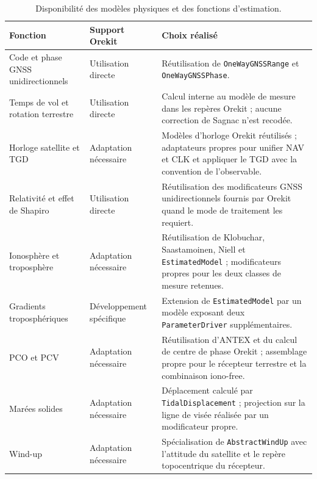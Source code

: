\begin{table}[H]
\centering
\caption{Disponibilité des modèles physiques et des fonctions d'estimation.}
\label{tab:orekit_model_support}
\small
\begin{tabularx}{\textwidth}{p{3.3cm} p{3.0cm} X}
\hline
\textbf{Fonction} & \textbf{Support Orekit} & \textbf{Choix réalisé} \\
\hline
Code et phase GNSS unidirectionnels & Utilisation directe &
Réutilisation de \texttt{OneWayGNSSRange} et
\texttt{OneWayGNSSPhase}. \\

Temps de vol et rotation terrestre & Utilisation directe &
Calcul interne au modèle de mesure dans les repères Orekit ; aucune correction
de Sagnac n'est recodée. \\

Horloge satellite et TGD & Adaptation nécessaire &
Modèles d'horloge Orekit réutilisés ; adaptateurs propres pour unifier NAV et
CLK et appliquer le TGD avec la convention de l'observable. \\

Relativité et effet de Shapiro & Utilisation directe &
Réutilisation des modificateurs GNSS unidirectionnels fournis par Orekit quand
le mode de traitement les requiert. \\

Ionosphère et troposphère & Adaptation nécessaire &
Réutilisation de Klobuchar, Saastamoinen, Niell et
\texttt{EstimatedModel} ; modificateurs propres pour les deux classes de
mesure retenues. \\

Gradients troposphériques & Développement spécifique &
Extension de \texttt{EstimatedModel} par un modèle exposant deux
\texttt{ParameterDriver} supplémentaires. \\

PCO et PCV & Adaptation nécessaire &
Réutilisation d'ANTEX et du calcul de centre de phase Orekit ; assemblage
propre pour le récepteur terrestre et la combinaison iono-free. \\

Marées solides & Adaptation nécessaire &
Déplacement calculé par \texttt{TidalDisplacement} ; projection sur la ligne
de visée réalisée par un modificateur propre. \\

Wind-up & Adaptation nécessaire &
Spécialisation de \texttt{AbstractWindUp} avec l'attitude du satellite et le
repère topocentrique du récepteur. \\


\end{tabularx}
\end{table}
